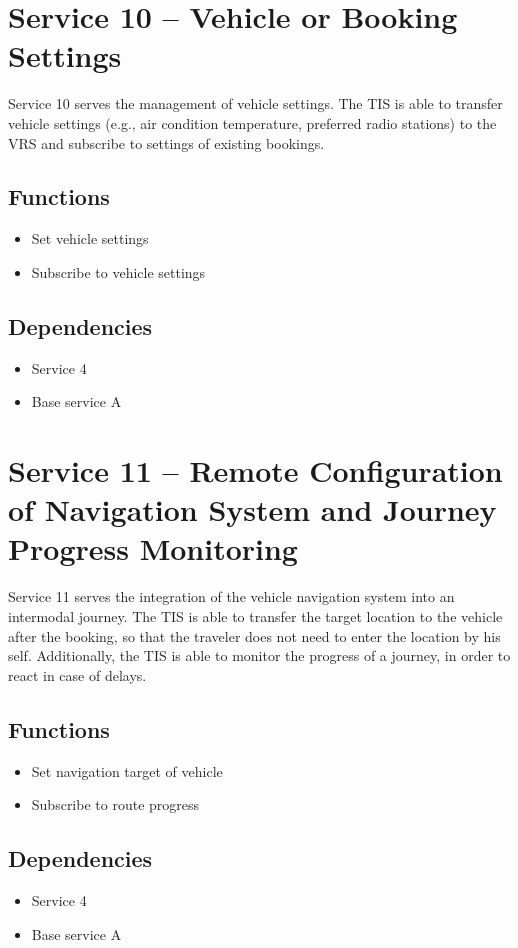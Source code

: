 \section{Service 10 -- Vehicle or Booking Settings}
Service 10 serves the management of vehicle settings. The TIS is able to transfer vehicle settings (e.g., air condition temperature, preferred radio stations) to the VRS and subscribe to settings of existing bookings.

\subsection*{Functions}
\begin{itemize}
\item Set vehicle settings 
\item Subscribe to vehicle settings
\end{itemize}

\subsection*{Dependencies}
\begin{itemize}
\item Service 4
\item Base service A
\end{itemize}

\section{Service 11 -- Remote Configuration of Navigation System and Journey Progress Monitoring}
Service 11 serves the integration of the vehicle navigation system into an intermodal journey. The TIS is able to transfer the target location to the vehicle after the booking, so that the traveler does not need to enter the location by his self. Additionally, the TIS is able to monitor the progress of a journey, in order to react in case of delays.

\subsection*{Functions}
\begin{itemize}
\item Set navigation target of vehicle
\item Subscribe to route progress
\end{itemize}

\subsection*{Dependencies}
\begin{itemize}
\item Service 4
\item Base service A
\end{itemize}
